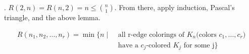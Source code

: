 \Proof. $R(2,n) = R(n,2) = n ≤ {n \choose 1}$. From there, apply induction, Pascal's triangle, and the above lemma.

\begin{definition}
\begin{align*}
  R(n_1,n_2,\ldots,n_r) = \min \{ n \mid
    &\text{ all r-edge colorings of $K_n$
      (colors $c_1,\ldots,c_r$)} \\
    & \text{ have a $c_j$-colored $K_j$ for some j}\}
\end{align*}
\end{definition}











